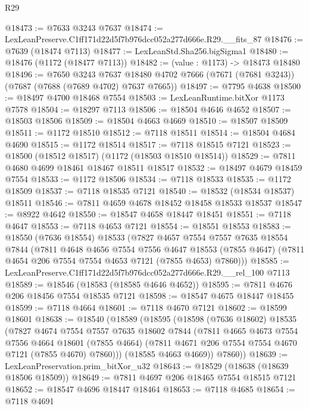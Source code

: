 \begin{lexlean}{R29}
\begin{coremodule}
@18473 := @7633 @3243 @7637
@18474 := LexLeanPreserve.C1ff171d22d5f7b976dcc052a277d666e.R29.__fits_87
@18476 := @7639 (@18474 @7113)
@18477 := LexLeanStd.Sha256.bigSigma1
@18480 := @18476 (@1172 (@18477 @7113))
@18482 := (value : @1173) -> @18473 @18480
@18496 := @7650
    @3243
    @7637
    @18480
    @4702
    @7666
    (@7671 (@7681 @3243))
    (@7687 (@7688 (@7689 @4702) @7637 @7665))
@18497 := @7795 @4638
@18500 := @18497 @4700 @18468 @7554
@18503 := LexLeanRuntime.bitXor @1173 @7578
@18504 := @18297 @7113
@18506 := @18504 @4646 @4652
@18507 := @18503 @18506
@18509 := @18504 @4663 @4669
@18510 := @18507 @18509
@18511 := @1172 @18510
@18512 := @7118 @18511
@18514 := @18504 @4684 @4690
@18515 := @1172 @18514
@18517 := @7118 @18515 @7121
@18523 := @18500 (@18512 @18517) (@1172 (@18503 @18510 @18514))
@18529 := @7811 @4680 @4699 @18461 @18467 @18511 @18517
@18532 := @18497 @4679 @18459 @7554
@18533 := @1172 @18506
@18534 := @7118 @18533
@18535 := @1172 @18509
@18537 := @7118 @18535 @7121
@18540 := @18532 (@18534 @18537) @18511
@18546 := @7811 @4659 @4678 @18452 @18458 @18533 @18537
@18547 := @8922 @4642
@18550 := @18547 @4658 @18447 @18451
@18551 := @7118 @4647
@18553 := @7118 @4653 @7121
@18554 := @18551 @18553
@18583 := @18550
    (@7636 @18554)
    @18533
    (@7827
      @4657
      @7554
      @7557
      @7635
      @18554
      @7844
      (@7811
        @4648
        @4656
        @7554
        @7556
        @4647
        @18553
        (@7855 @4647)
        (@7811 @4654 @206 @7554 @7554 @4653 @7121 (@7855 @4653) @7860)))
@18585 := LexLeanPreserve.C1ff171d22d5f7b976dcc052a277d666e.R29.__rel_100 @7113
@18589 := @18546 (@18583 (@18585 @4646 @4652))
@18595 := @7811 @4676 @206 @18456 @7554 @18535 @7121
@18598 := @18547 @4675 @18447 @18455
@18599 := @7118 @4664
@18601 := @7118 @4670 @7121
@18602 := @18599 @18601
@18638 := @18540
    (@18589
      (@18595
        (@18598
          (@7636 @18602)
          @18535
          (@7827
            @4674
            @7554
            @7557
            @7635
            @18602
            @7844
            (@7811
              @4665
              @4673
              @7554
              @7556
              @4664
              @18601
              (@7855 @4664)
              (@7811 @4671 @206 @7554 @7554 @4670 @7121 (@7855 @4670) @7860)))
          (@18585 @4663 @4669))
        @7860))
@18639 := LexLeanPreservation.prim_bitXor_u32
@18643 := @18529 (@18638 (@18639 @18506 @18509))
@18649 := @7811 @4697 @206 @18465 @7554 @18515 @7121
@18652 := @18547 @4696 @18447 @18464
@18653 := @7118 @4685
@18654 := @7118 @4691

\end{coremodule}
\end{lexlean}
